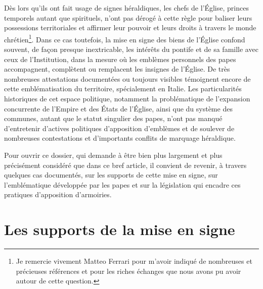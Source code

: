 \documentclass[12pt,twoside,openany]{book}
\begin{document}
Dès lors qu’ils ont fait usage de signes héraldiques, les chefs de l’Église, princes temporels autant que spirituels, n’ont pas dérogé à cette règle pour baliser leurs possessions territoriales et affirmer leur pouvoir et leurs droits à travers le monde chrétien\footnote{Je remercie vivement Matteo Ferrari pour m’avoir indiqué de nombreuses et précieuses références et pour les riches échanges que nous avons pu avoir autour de cette question.}. Dans ce cas toutefois, la mise en signe des biens de l’Église confond souvent, de façon presque inextricable, les intérêts du pontife et de sa famille avec ceux de l’Institution, dans la mesure où les emblèmes personnels des papes accompagnent, complètent ou remplacent les insignes de l’Église. De très nombreuses attestations documentées ou toujours visibles témoignent encore de cette emblématisation du territoire, spécialement en Italie. Les particularités historiques de cet espace politique, notamment la problématique de l’expansion concurrente de l’Empire et des États de l’Église, ainsi que du système des communes, autant que le statut singulier des papes, n’ont pas manqué d’entretenir d’actives politiques d’apposition d’emblèmes et de soulever de nombreuses contestations et d’importants conflits de marquage héraldique.

Pour ouvrir ce dossier, qui demande à être bien plus largement et plus précisément considéré que dans ce bref article, il convient de revenir, à travers quelques cas documentés, sur les supports de cette mise en signe, sur l’emblématique développée par les papes et sur la législation qui encadre ces pratiques d’apposition d’armoiries.

\section{Les supports de la mise en signe}
\end{document}
